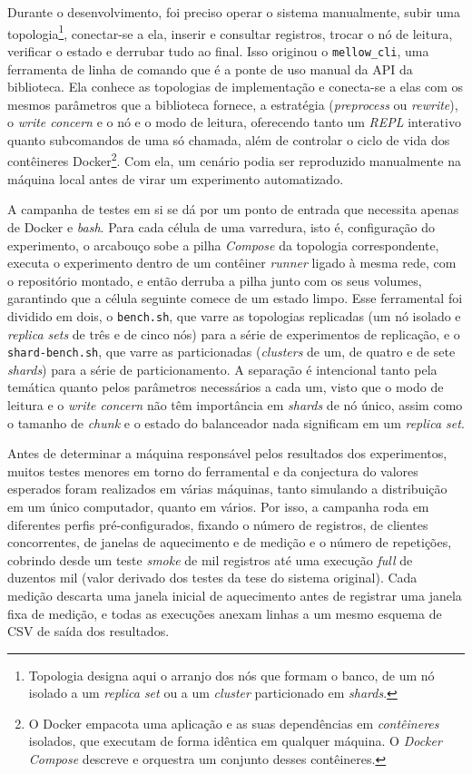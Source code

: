 Durante o desenvolvimento, foi preciso operar o sistema manualmente, subir uma topologia\footnote{Topologia designa aqui o arranjo dos nós que formam o banco, de um nó isolado a um \textit{replica set} ou a um \textit{cluster} particionado em \textit{shards}.}, conectar-se a ela, inserir e consultar registros, trocar o nó de leitura, verificar o estado e derrubar tudo ao final. Isso originou o \texttt{mellow\_cli}, uma ferramenta de linha de comando que é a ponte de uso manual da API da biblioteca. Ela conhece as topologias de implementação e conecta-se a elas com os mesmos parâmetros que a biblioteca fornece, a estratégia (\textit{preprocess} ou \textit{rewrite}), o \textit{write concern} e o nó e o modo de leitura, oferecendo tanto um \textit{REPL} interativo quanto subcomandos de uma só chamada, além de controlar o ciclo de vida dos contêineres Docker\footnote{O Docker empacota uma aplicação e as suas dependências em \textit{contêineres} isolados, que executam de forma idêntica em qualquer máquina. O \textit{Docker Compose} descreve e orquestra um conjunto desses contêineres.}. Com ela, um cenário podia ser reproduzido manualmente na máquina local antes de virar um experimento automatizado.

A campanha de testes em si se dá por um ponto de entrada que necessita apenas de Docker e \textit{bash}. Para cada célula de uma varredura, isto é, configuração do experimento, o arcabouço sobe a pilha \textit{Compose} da topologia correspondente, executa o experimento dentro de um contêiner \textit{runner} ligado à mesma rede, com o repositório montado, e então derruba a pilha junto com os seus volumes, garantindo que a célula seguinte comece de um estado limpo. Esse ferramental foi dividido em dois, o \texttt{bench.sh}, que varre as topologias replicadas (um nó isolado e \textit{replica sets} de três e de cinco nós) para a série de experimentos de replicação, e o \texttt{shard-bench.sh}, que varre as particionadas (\textit{clusters} de um, de quatro e de sete \textit{shards}) para a série de particionamento. A separação é intencional tanto pela temática quanto pelos parâmetros necessários a cada um, visto que o modo de leitura e o \textit{write concern} não têm importância em \textit{shards} de nó único, assim como o tamanho de \textit{chunk} e o estado do balanceador nada significam em um \textit{replica set}.

Antes de determinar a máquina responsável pelos resultados dos experimentos, muitos testes menores em torno do ferramental e da conjectura do valores esperados foram realizados em várias máquinas, tanto simulando a distribuição em um único computador, quanto em vários. Por isso, a campanha roda em diferentes perfis pré-configurados, fixando o número de registros, de clientes concorrentes, de janelas de aquecimento e de medição e o número de repetições, cobrindo desde um teste \textit{smoke} de mil registros até uma execução \textit{full} de duzentos mil (valor derivado dos testes da tese do sistema original). Cada medição descarta uma janela inicial de aquecimento antes de registrar uma janela fixa de medição, e todas as execuções anexam linhas a um mesmo esquema de CSV de saída dos resultados. 

